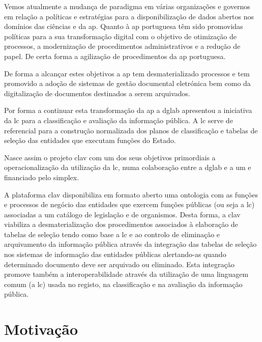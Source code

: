Vemos atualmente a mudança de paradigma em várias organizações e governos em relação a políticas e estratégias para a disponibilização de dados abertos nos domínios das ciências e da \acrfull{ap}. Quanto à \acrlong{ap} portuguesa têm sido promovidas políticas para a sua transformação digital com o objetivo de otimização de processos, a modernização de procedimentos administrativos e a redução de papel. De certa forma a agilização de procedimentos da \acrlong{ap} portuguesa.~\cite{clav}

De forma a alcançar estes objetivos a \acrlong{ap} tem desmaterializado processos e tem promovido a adoção de sistemas de gestão documental eletrónica bem como da digitalização de documentos destinados a serem arquivados.~\cite{clav}

Por forma a continuar esta transformação da \acrshort{ap} a \acrfull{dglab} apresentou a iniciativa da \acrfull{lc} para a classificação e avaliação da informação pública. A \acrshort{lc} serve de referencial para a construção normalizada dos planos de classificação e tabelas de seleção das entidades que executam funções do Estado.~\cite{clav}

Nasce assim o projeto \acrfull{clav} com um dos seus objetivos primordiais a operacionalização da utilização da \acrshort{lc}, numa colaboração entre a \acrshort{dglab} e a \acrfull{um} e financiado pelo \Gls{simplex}.~\cite{clav}

A plataforma \acrshort{clav} disponibiliza em formato aberto uma \gls{ontologia} com as funções e processos de negócio das entidades que exercem funções públicas (ou seja a \acrshort{lc}) associadas a um catálogo de legislação e de organismos. Desta forma, a \acrshort{clav} viabiliza a desmaterialização dos procedimentos associados à elaboração de tabelas de seleção tendo como base a \acrshort{lc} e ao controlo de eliminação e arquivamento da informação pública através da integração das tabelas de seleção nos sistemas de informação das entidades públicas alertando-as quando determinado documento deve ser arquivado ou eliminado. Esta integração promove também a interoperabilidade através da utilização de uma linguagem comum (a \acrshort{lc}) usada no registo, na classificação e na avaliação da informação pública.~\cite{clav}

\section{Motivação}


